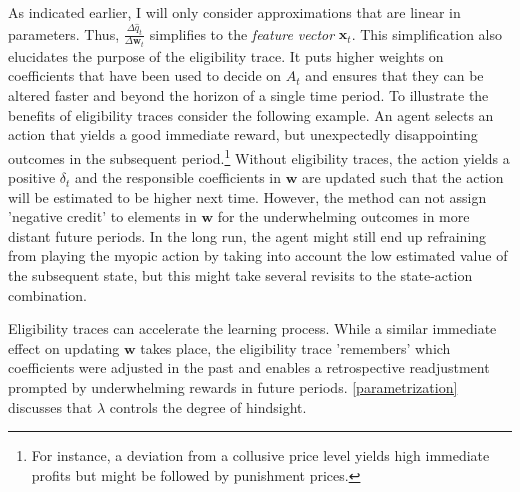 As indicated earlier, I will only consider approximations that are linear in parameters. Thus, $\frac{\Delta \hat{q}_t}{\Delta \boldsymbol{w}_t}$ simplifies to the \emph{feature vector} $\boldsymbol{x}_t$. This simplification also elucidates the purpose of the eligibility trace. It puts higher weights on coefficients that have been used to decide on $A_t$ and ensures that they can be altered faster and beyond the horizon of a single time period. To illustrate the benefits of eligibility traces consider the following example. An agent selects an action that yields a good immediate reward, but unexpectedly disappointing outcomes in the subsequent period.\footnote{For instance, a deviation from a collusive price level yields high immediate profits but might be followed by punishment prices.} Without eligibility traces, the action yields a positive $\delta_t$ and the responsible coefficients in $\boldsymbol{w}$ are updated such that the action will be estimated to be higher next time. However, the method can not assign 'negative credit' to elements in $\boldsymbol{w}$ for the underwhelming outcomes in more distant future periods. In the long run, the agent might still end up refraining from playing the myopic action by taking into account the low estimated value of the subsequent state, but this might take several revisits to the state-action combination.

Eligibility traces can accelerate the learning process. While a similar immediate effect on updating $\boldsymbol{w}$ takes place, the eligibility trace 'remembers' which coefficients were adjusted in the past and enables a retrospective readjustment prompted by underwhelming rewards in future periods. \autoref{parametrization} discusses that $\lambda$ controls the degree of hindsight. 

